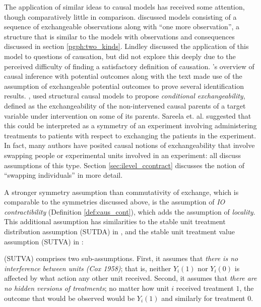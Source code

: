 The application of similar ideas to causal models has received some attention, though comparatively little in comparison. \citet{lindley_role_1981} discussed models consisting of a sequence of exchangeable observations along with ``one more observation'', a structure that is similar to the models with observations and consequences discussed in section \ref{pgph:two_kinds}. Lindley discussed the application of this model to questions of causation, but did not explore this deeply due to the perceived difficulty of finding a satisfactory definition of causation. \citet{rubin_causal_2005}'s overview of causal inference with potential outcomes along with the text \citet{imbens_causal_2015} made use of the assumption of exchangeable potential outcomes to prove several identification results. \citet{saarela_role_2020}, used structural causal models to propose \emph{conditional exchangeability}, defined as the exchangeability of the non-intervened causal parents of a target variable under intervention on some of its parents. Sareela et. al. suggested that this could be interpreted as a symmetry of an experiment involving administering treatments to patients with respect to exchanging the patients in the experiment. In fact, many authors have posited causal notions of exchangeability that involve swapping people or experimental units involved in an experiment: \citet{hernan_estimating_2006,hernan_beyond_2012,greenland_identifiability_1986,banerjee_chapter_2017,dawid_decision-theoretic_2020} all discuss assumptions of this type. Section \ref{sec:ilevel_ccontract} discusses the notion of ``swapping individuals'' in more detail.

A stronger symmetry assumption than commutativity of exchange, which is comparable to the symmetries discussed above, is the assumption of \emph{IO contractibility} (Definition \ref{def:caus_cont}), which adds the assumption of \emph{locality}. This additional assumption has similarities to the stable unit treatment distribution assumption (SUTDA) in \citet{dawid_decision-theoretic_2020}, and the stable unit treatment value assumption (SUTVA) in \citep{rubin_causal_2005}:
\begin{blockquote}
(SUTVA) comprises two sub-assumptions. First, it assumes that \emph{there is no interference between units (Cox 1958)}; that is, neither $Y_i(1)$ nor $Y_i(0)$ is affected by what action any other unit received. Second, it assumes that \emph{there are no hidden versions of treatments}; no matter how unit $i$ received treatment $1$, the outcome that would be observed would be $Y_i(1)$ and similarly for treatment $0$.
\end{blockquote}


